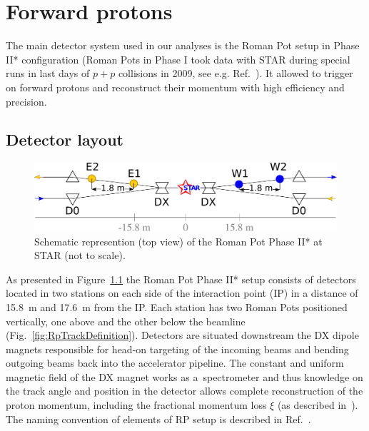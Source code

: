 

\chapter{Forward protons}\label{chap:forwardProtons}

The main detector system used in our analyses is the Roman Pot setup in Phase II* configuration (Roman Pots in Phase I took data with STAR during special runs in last days of $p+p$ collisions in 2009, see e.g. Ref.~\cite{A_N,A_N_note,Sikora:2014hca}). It allowed to trigger on forward protons and reconstruct their momentum with high efficiency and precision.

\section{Detector layout}

\begin{figure}[h]\vspace*{-10pt}%
\centering\includegraphics[width=\linewidth]{graphics/rpSim/RP_phaseII.pdf}%
\caption[Schematic represention (top view) of the Roman Pot Phase II* at STAR.]{Schematic represention (top view) of the Roman Pot Phase II* at STAR (not to scale).}\label{fig:RPphaseII}%
\end{figure}

As presented in Figure~\ref{fig:RPphaseII} the Roman Pot Phase II* setup consists of detectors located in two stations on each side of the interaction point (IP) in a distance of 15.8~m and 17.6~m from the IP. Each station has two Roman Pots positioned vertically, one above and the other below the beamline (Fig.~\ref{fig:RpTrackDefinition}). Detectors are situated downstream the DX dipole magnets responsible for head-on targeting of the incoming beams and bending outgoing beams back into the accelerator pipeline. The constant and uniform magnetic field of the DX magnet works as a~spectrometer and thus knowledge on the track angle and position in the detector allows complete reconstruction of the proton momentum, including the fractional momentum loss $\xi$ (as described in~\cite{MomentumReco}). The naming convention of elements of RP setup is described in Ref.~\cite{Labeling}.

